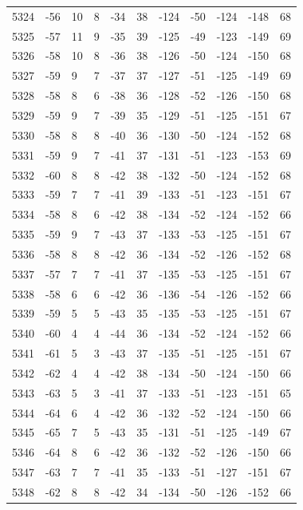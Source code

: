 \begin{table}[H]
\begin{tabular}{lllllllllll}
5324 & -56 & 10 & 8 & -34 & 38 & -124 & -50 & -124 & -148 & 68 \\
5325 & -57 & 11 & 9 & -35 & 39 & -125 & -49 & -123 & -149 & 69 \\
5326 & -58 & 10 & 8 & -36 & 38 & -126 & -50 & -124 & -150 & 68 \\
5327 & -59 & 9 & 7 & -37 & 37 & -127 & -51 & -125 & -149 & 69 \\
5328 & -58 & 8 & 6 & -38 & 36 & -128 & -52 & -126 & -150 & 68 \\
5329 & -59 & 9 & 7 & -39 & 35 & -129 & -51 & -125 & -151 & 67 \\
5330 & -58 & 8 & 8 & -40 & 36 & -130 & -50 & -124 & -152 & 68 \\
5331 & -59 & 9 & 7 & -41 & 37 & -131 & -51 & -123 & -153 & 69 \\
5332 & -60 & 8 & 8 & -42 & 38 & -132 & -50 & -124 & -152 & 68 \\
5333 & -59 & 7 & 7 & -41 & 39 & -133 & -51 & -123 & -151 & 67 \\
5334 & -58 & 8 & 6 & -42 & 38 & -134 & -52 & -124 & -152 & 66 \\
5335 & -59 & 9 & 7 & -43 & 37 & -133 & -53 & -125 & -151 & 67 \\
5336 & -58 & 8 & 8 & -42 & 36 & -134 & -52 & -126 & -152 & 68 \\
5337 & -57 & 7 & 7 & -41 & 37 & -135 & -53 & -125 & -151 & 67 \\
5338 & -58 & 6 & 6 & -42 & 36 & -136 & -54 & -126 & -152 & 66 \\
5339 & -59 & 5 & 5 & -43 & 35 & -135 & -53 & -125 & -151 & 67 \\
5340 & -60 & 4 & 4 & -44 & 36 & -134 & -52 & -124 & -152 & 66 \\
5341 & -61 & 5 & 3 & -43 & 37 & -135 & -51 & -125 & -151 & 67 \\
5342 & -62 & 4 & 4 & -42 & 38 & -134 & -50 & -124 & -150 & 66 \\
5343 & -63 & 5 & 3 & -41 & 37 & -133 & -51 & -123 & -151 & 65 \\
5344 & -64 & 6 & 4 & -42 & 36 & -132 & -52 & -124 & -150 & 66 \\
5345 & -65 & 7 & 5 & -43 & 35 & -131 & -51 & -125 & -149 & 67 \\
5346 & -64 & 8 & 6 & -42 & 36 & -132 & -52 & -126 & -150 & 66 \\
5347 & -63 & 7 & 7 & -41 & 35 & -133 & -51 & -127 & -151 & 67 \\
5348 & -62 & 8 & 8 & -42 & 34 & -134 & -50 & -126 & -152 & 66 \\

\end{tabular}
\end{table}
